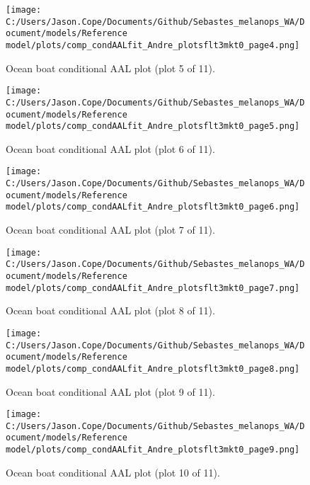 \documentclass[11pt,
  english,
  letterpaper,
]{article}
\begin{document}
\begin{figure}
\centering
\texttt{[image: C:/Users/Jason.Cope/Documents/Github/Sebastes\_melanops\_WA/Document/models/Reference model/plots/comp\_condAALfit\_Andre\_plotsflt3mkt0\_page4.png]}
\caption{Ocean boat conditional AAL plot (plot 5 of 11).\label{fig:comp_condAALfit_Andre_plotsflt3mkt0_page4}}
\end{figure}

\begin{figure}
\centering
\texttt{[image: C:/Users/Jason.Cope/Documents/Github/Sebastes\_melanops\_WA/Document/models/Reference model/plots/comp\_condAALfit\_Andre\_plotsflt3mkt0\_page5.png]}
\caption{Ocean boat conditional AAL plot (plot 6 of 11).\label{fig:comp_condAALfit_Andre_plotsflt3mkt0_page5}}
\end{figure}

\begin{figure}
\centering
\texttt{[image: C:/Users/Jason.Cope/Documents/Github/Sebastes\_melanops\_WA/Document/models/Reference model/plots/comp\_condAALfit\_Andre\_plotsflt3mkt0\_page6.png]}
\caption{Ocean boat conditional AAL plot (plot 7 of 11).\label{fig:comp_condAALfit_Andre_plotsflt3mkt0_page6}}
\end{figure}

\begin{figure}
\centering
\texttt{[image: C:/Users/Jason.Cope/Documents/Github/Sebastes\_melanops\_WA/Document/models/Reference model/plots/comp\_condAALfit\_Andre\_plotsflt3mkt0\_page7.png]}
\caption{Ocean boat conditional AAL plot (plot 8 of 11).\label{fig:comp_condAALfit_Andre_plotsflt3mkt0_page7}}
\end{figure}

\begin{figure}
\centering
\texttt{[image: C:/Users/Jason.Cope/Documents/Github/Sebastes\_melanops\_WA/Document/models/Reference model/plots/comp\_condAALfit\_Andre\_plotsflt3mkt0\_page8.png]}
\caption{Ocean boat conditional AAL plot (plot 9 of 11).\label{fig:comp_condAALfit_Andre_plotsflt3mkt0_page8}}
\end{figure}

\begin{figure}
\centering
\texttt{[image: C:/Users/Jason.Cope/Documents/Github/Sebastes\_melanops\_WA/Document/models/Reference model/plots/comp\_condAALfit\_Andre\_plotsflt3mkt0\_page9.png]}
\caption{Ocean boat conditional AAL plot (plot 10 of 11).\label{fig:comp_condAALfit_Andre_plotsflt3mkt0_page9}}
\end{figure}
\end{document}
